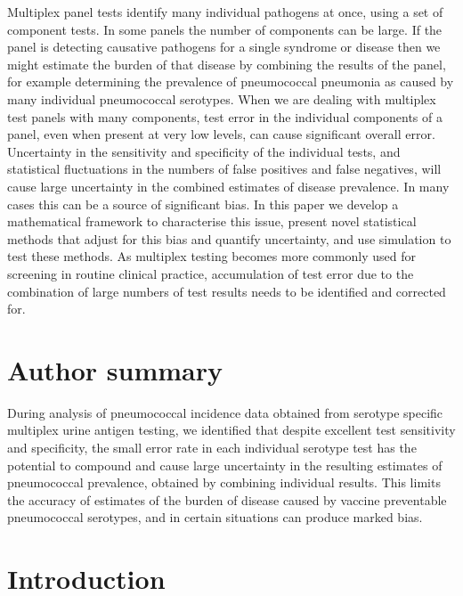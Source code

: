 \documentclass[10pt,letterpaper]{article}
\begin{document}
Multiplex panel tests identify many individual pathogens at once, using a set of component tests. In some panels the number of components can be large. If the panel is detecting causative pathogens for a single syndrome or disease then we might estimate the burden of that disease by combining the results of the panel, for example determining the prevalence of pneumococcal pneumonia as caused by many individual pneumococcal serotypes. When we are dealing with multiplex test panels with many components, test error in the individual components of a panel, even when present at very low levels, can cause significant overall error. Uncertainty in the sensitivity and specificity of the individual tests, and statistical fluctuations in the numbers of false positives and false negatives, will cause large uncertainty in the combined estimates of disease prevalence. In many cases this can be a source of significant bias. In this paper we develop a mathematical framework to characterise this issue, present novel statistical methods that adjust for this bias and quantify uncertainty, and use simulation to test these methods. As multiplex testing becomes more commonly used for screening in routine clinical practice, accumulation of test error due to the combination of large numbers of test results needs to be identified and corrected for.


\section*{Author summary}

During analysis of pneumococcal incidence data obtained from serotype specific multiplex urine antigen testing, we identified that despite excellent test sensitivity and specificity, the small error rate in each individual serotype test has the potential to compound and cause large uncertainty in the resulting estimates of pneumococcal prevalence, obtained by combining individual results. This limits the accuracy of estimates of the burden of disease caused by vaccine preventable pneumococcal serotypes, and in certain situations can produce marked bias.

\linenumbers

\section*{Introduction}
\end{document}
